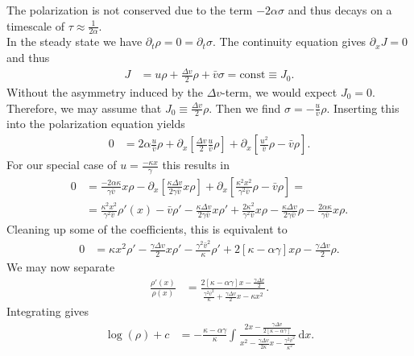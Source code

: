 \documentclass[english, parskip=full]{scrartcl}
\newcommand{\intx}{}
\newcommand{\klam}{}
\newcommand{\tecxt}{}
\begin{document}
The polarization is not conserved due to the term $-2\alpha\sigma$ and thus decays on a timescale of $\tau \approx\frac{1}{2\alpha}$.
\\
In the steady state we have $\partial_t\rho=0=\partial_t\sigma$.
The continuity equation gives $\partial_xJ=0$ and thus 
\begin{align}
J&=u\rho + \frac{\Delta v}{2}\rho + \bar{v}\sigma = \tecxt\text{const} \equiv J_0.%
\end{align}
Without the asymmetry induced by the $\Delta v$-term, we would expect $J_0=0$.
Therefore, we may assume that $J_0 \equiv \frac{\Delta v}{2}\rho$.
Then we find $\sigma = -\frac{u}{\bar{v}}\rho$.
Inserting this into the polarization equation yields
\begin{align}
0 &= 2\alpha \frac{u}{\bar{v}} \rho + \partial_x\klam\left[ \frac{\Delta v}{2} \frac{u}{\bar{v}}\rho \right] + \partial_x\klam\left[ \frac{u^2}{\bar{v}}\rho - \bar{v}\rho \right].
\end{align}
For our special case of $u = \frac{-\kappa x}{\gamma}$ this results in
\begin{align}
0 &= \frac{-2\alpha\kappa}{\gamma \bar{v}} x\rho - \partial_x\klam\left[ \frac{\kappa\Delta v }{2\gamma \bar{v}} x\rho \right] + \partial_x \klam\left[ \frac{\kappa^2 x^2}{\gamma^2\bar{v}} \rho - \bar{v}\rho \right] = \\
&= \frac{\kappa^2x^2}{\gamma^2\bar{v}} \rho'(x) - \bar{v}\rho' - \frac{\kappa\Delta v}{2\gamma\bar{v}} x\rho' + \frac{2\kappa^2}{\gamma^2\bar{v}} x\rho - \frac{\kappa \Delta v}{2\gamma\bar{v}} \rho - \frac{2\alpha\kappa}{\gamma\bar{v}} x\rho.
\end{align}
Cleaning up some of the coefficients, this is equivalent to
\begin{align}
0 &= \kappa x^2\rho' - \frac{\gamma\Delta v}{2} x\rho' - \frac{\gamma^2\bar{v}^2}{\kappa} \rho' + 2\klam\left[ \kappa - \alpha\gamma \right] x\rho - \frac{\gamma\Delta v}{2} \rho.
\end{align}
We may now separate
\begin{align}
\frac{\rho'(x)}{\rho(x)} &= \frac{2[\kappa -\alpha\gamma]x - \frac{\gamma\Delta v}{2}}{\frac{\gamma^2\bar{v}^2}{\kappa} + \frac{\gamma\Delta v}{2}x - \kappa x^2}.
\end{align}
Integrating gives
\begin{align}
\log(\rho) + c &= -\frac{\kappa - \alpha\gamma}{\kappa} \intx\int_{ }^{ } \frac{2x - \frac{\gamma\Delta v}{2[\kappa - \alpha\gamma]}}{x^2 - \frac{\gamma\Delta v}{2\kappa}x - \frac{\gamma^2\bar{v}^2}{\kappa^2}} \, \mathrm{d}x.
\end{align}
\end{document}
